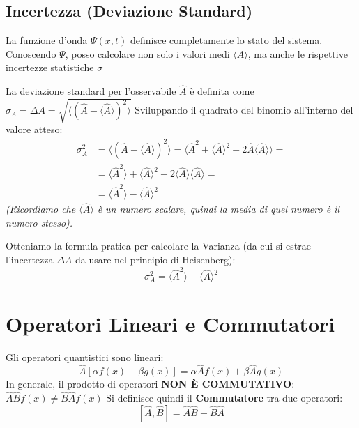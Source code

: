 \documentclass[11pt, a4paper]{article}
\begin{document}
\subsection{Incertezza (Deviazione Standard)} %

La funzione d'onda $\Psi(x,t)$ definisce completamente lo stato del sistema. Conoscendo $\Psi$, posso calcolare non solo i valori medi $\langle A \rangle$, ma anche le rispettive incertezze statistiche $\sigma$ %

\noindent
La deviazione standard per l'osservabile $\hat{A}$ è definita come $\sigma_A = \Delta A = \sqrt{\langle (\hat{A} - \langle \hat{A} \rangle)^2 \rangle}$ %
Sviluppando il quadrato del binomio all'interno del valore atteso: %
\begin{align*}
    \sigma_A^2 &= \langle (\hat{A} - \langle \hat{A} \rangle)^2 \rangle = \langle \hat{A}^2 + \langle \hat{A} \rangle^2 - 2\hat{A}\langle \hat{A} \rangle \rangle = \\ %
               &= \langle \hat{A}^2 \rangle + \langle \hat{A} \rangle^2 - 2\langle \hat{A} \rangle\langle \hat{A} \rangle = \\ %
               &= \langle \hat{A}^2 \rangle - \langle \hat{A} \rangle^2 %
\end{align*}
\textit{(Ricordiamo che $\langle \hat{A} \rangle$ è un numero scalare, quindi la media di quel numero è il numero stesso).} %

\noindent
Otteniamo la formula pratica per calcolare la Varianza (da cui si estrae l'incertezza $\Delta A$ da usare nel principio di Heisenberg): %
\begin{equation}
    \boxed{ \sigma_A^2 = \langle \hat{A}^2 \rangle - \langle \hat{A} \rangle^2 } %
\end{equation}

\section{Operatori Lineari e Commutatori} %

Gli operatori quantistici sono lineari: %
\begin{equation*}
    \hat{A} [\alpha f(x) + \beta g(x)] = \alpha \hat{A}f(x) + \beta \hat{A}g(x) %
\end{equation*}
In generale, il prodotto di operatori \textbf{NON È COMMUTATIVO}: $\hat{A}\hat{B}f(x) \neq \hat{B}\hat{A}f(x)$ %
Si definisce quindi il \textbf{Commutatore} tra due operatori: %
\begin{equation}
    \boxed{ [\hat{A}, \hat{B}] = \hat{A}\hat{B} - \hat{B}\hat{A} } %
\end{equation}
\end{document}
